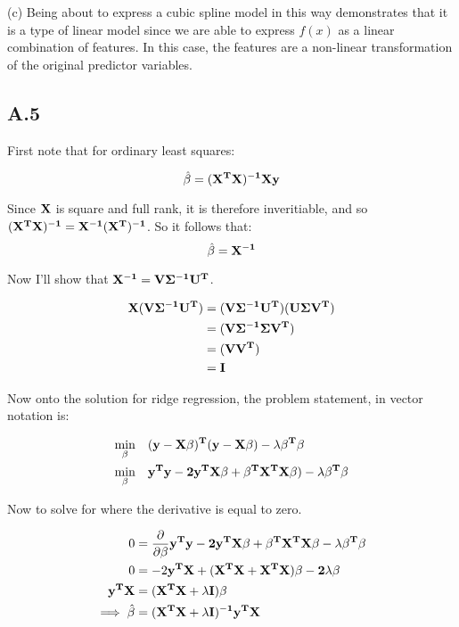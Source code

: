 \documentclass{article}
\begin{document}
    (c) Being about to express a cubic spline model in this way demonstrates that it is a type of linear model 
    since we are able to express $f(x)$ as a linear combination of features. In this case, the features are 
    a non-linear transformation of the original predictor variables.

    \subsection{A.5 }    

    First note that for ordinary least squares:

    \[\hat{\beta} = (\bf{X}^T\bf{X})^{-1}\bf{X}\bf{y}\]

    Since $\bf{X}$ is square and full rank, it is therefore inveritiable, and so 
    $(\bf{X}^T\bf{X})^{-1} = \bf{X}^{-1} (\bf{X}^{T})^{-1}$. So it follows that:
    \[\hat{\beta} = \bf{X}^{-1}\]

    Now I'll show that $\bf{X}^{-1} = V \Sigma ^{-1}U^T$.

    \[
        \begin{aligned}
            \bf{X(V \Sigma ^{-1}U^T)} & = \bf{(V \Sigma ^{-1}U^T)}(U \Sigma V^T)\\
            & =  \bf{(V \Sigma ^{-1}}\Sigma V^T)\\
            & =  \bf{(VV^T)}\\
            & =  \bf{I}\\
        \end{aligned}
    \]

    Now onto the solution for ridge regression, the problem statement, in vector notation is:

    \[
        \begin{aligned}
            \min_\beta \quad & (\bf{y-X\beta)^T(y-X\beta}) - \lambda \beta^T\beta \\
           \min_\beta \quad & \bf{y^Ty-2y^TX\beta + \beta^T X^T X\beta}) - \lambda \beta^T\beta
        \end{aligned}
    \]
    
    Now to solve for where the derivative is equal to zero.

    \[
        \begin{aligned}
            0 & =  \frac{\partial}{\partial \beta} \bf{y^Ty-2y^TX\beta + \beta^T X^T X\beta} - \lambda \beta^T\beta \\
            0 & =  -2\bf{y^TX + (X^T X + X^T X) \beta} - 2\lambda \beta \\
            \bf{y^TX} & = \bf{(X^T X + \lambda I)\beta} \\
            \implies \hat{\beta} & = \bf{(X^T X + \lambda I)^{-1}y^TX}
        \end{aligned}
    \]

    
\end{document}
